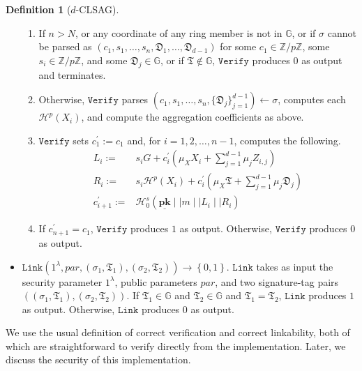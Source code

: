 \documentclass{article}
\theoremstyle{plain}
\theoremstyle{definition}
\newtheorem{defn}{Definition}[section]
\begin{document}
\begin{defn}[$d$-CLSAG]
\begin{itemize}
\begin{enumerate}
\item If $n > N$, or any coordinate of any ring member is not in $\mathbb{G}$, or if $\sigma$ cannot be parsed as $(c_1, s_1, \ldots, s_n, \mathfrak{D}_1, \ldots, \mathfrak{D}_{d-1})$ for some $c_1 \in \mathbb{Z}/p\mathbb{Z}$, some $s_i \in \mathbb{Z}/p\mathbb{Z}$, and some $\mathfrak{D}_j \in \mathbb{G}$, or if $\mathfrak{T} \notin \mathbb{G}$, $\texttt{Verify}$ produces $0$ as output and terminates.

\item Otherwise, $\texttt{Verify}$ parses $(c_1, s_1, \ldots, s_n, \{\mathfrak{D}_j\}_{j=1}^{d-1}) \leftarrow \sigma$, computes each $\mathcal{H}^p(X_i)$, and compute the aggregation coefficients as above.

\item $\texttt{Verify}$ sets $c_1^\prime := c_1$ and, for $i=1, 2, \ldots, n-1$, computes the following.
\begin{align*}
L_i :=& s_i G + c_i^\prime \left(\mu_X X_i + \sum_{j=1}^{d-1} \mu_jZ_{i,j}\right) \\ 
R_i :=& s_i \mathcal{H}^p(X_i) + c_i^\prime\left(\mu_X \mathfrak{T} + \sum_{j=1}^{d-1} \mu_j \mathfrak{D}_j\right)\\
c_{i+1}^\prime :=& \mathcal{H}^s_0\left(\underline{\textbf{pk}} \mid \mid m \mid \mid L_i \mid \mid R_i\right)
\end{align*}
\item If $c_{n+1}^\prime = c_1$, $\texttt{Verify}$ produces $1$ as output. Otherwise, $\texttt{Verify}$ produces $0$ as output.
\end{enumerate}

\item $\texttt{Link}\left(1^\lambda, \textit{par}, (\sigma_1, \mathfrak{T}_1), (\sigma_2, \mathfrak{T}_2)\right) \to \left\{0,1\right\}$. $\texttt{Link}$ takes as input the security parameter $1^\lambda$, public parameters $\textit{par}$, and two signature-tag pairs $((\sigma_1, \mathfrak{T}_1), (\sigma_2, \mathfrak{T}_2))$. If $\mathfrak{T}_1 \in \mathbb{G}$ and $\mathfrak{T}_2 \in \mathbb{G}$ and $\mathfrak{T}_1 = \mathfrak{T}_2$, $\texttt{Link}$ produces $1$ as output. Otherwise, $\texttt{Link}$ produces $0$ as output.
\end{itemize}

\end{defn}

We use the usual definition of correct verification and correct linkability, both of which are straightforward to verify directly from the implementation. Later, we discuss the security of this implementation. 
\end{document}
